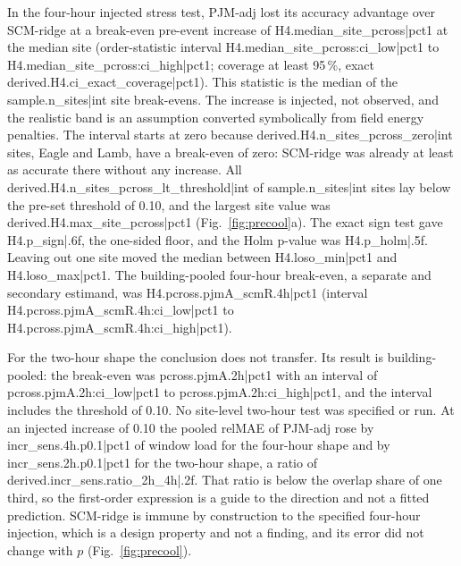 In the four-hour injected stress test, PJM-adj lost its accuracy advantage over SCM-ridge at a break-even pre-event increase of {{H4.median_site_pcross|pct1}} at the median site (order-statistic interval {{H4.median_site_pcross:ci_low|pct1}} to {{H4.median_site_pcross:ci_high|pct1}}; coverage at least 95\,\%, exact {{derived.H4.ci_exact_coverage|pct1}}). This statistic is the median of the {{sample.n_sites|int}} site break-evens. The increase is injected, not observed, and the realistic band is an assumption converted symbolically from field energy penalties. The interval starts at zero because {{derived.H4.n_sites_pcross_zero|int}} sites, Eagle and Lamb, have a break-even of zero: SCM-ridge was already at least as accurate there without any increase. All {{derived.H4.n_sites_pcross_lt_threshold|int}} of {{sample.n_sites|int}} sites lay below the pre-set threshold of 0.10, and the largest site value was {{derived.H4.max_site_pcross|pct1}} (Fig.~\ref{fig:precool}a). The exact sign test gave {{H4.p_sign|.6f}}, the one-sided floor, and the Holm p-value was {{H4.p_holm|.5f}}. Leaving out one site moved the median between {{H4.loso_min|pct1}} and {{H4.loso_max|pct1}}. The building-pooled four-hour break-even, a separate and secondary estimand, was {{H4.pcross.pjmA_scmR.4h|pct1}} (interval {{H4.pcross.pjmA_scmR.4h:ci_low|pct1}} to {{H4.pcross.pjmA_scmR.4h:ci_high|pct1}}).

For the two-hour shape the conclusion does not transfer. Its result is building-pooled: the break-even was {{pcross.pjmA.2h|pct1}} with an interval of {{pcross.pjmA.2h:ci_low|pct1}} to {{pcross.pjmA.2h:ci_high|pct1}}, and the interval includes the threshold of 0.10. No site-level two-hour test was specified or run. At an injected increase of 0.10 the pooled relMAE of PJM-adj rose by {{incr_sens.4h.p0.1|pct1}} of window load for the four-hour shape and by {{incr_sens.2h.p0.1|pct1}} for the two-hour shape, a ratio of {{derived.incr_sens.ratio_2h_4h|.2f}}. That ratio is below the overlap share of one third, so the first-order expression is a guide to the direction and not a fitted prediction. SCM-ridge is immune by construction to the specified four-hour injection, which is a design property and not a finding, and its error did not change with $p$ (Fig.~\ref{fig:precool}).

